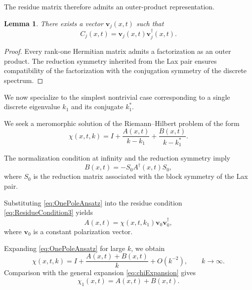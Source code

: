 \documentclass[11pt]{amsart}
\newtheorem{lemma}{Lemma}[section]
\theoremstyle{definition}
\numberwithin{equation}{section}
\begin{document}
The residue matrix therefore admits an outer-product representation.

\begin{lemma}
There exists a vector $\mathbf v_j(x,t)$ such that
\begin{equation}
C_j(x,t)
=
\mathbf v_j(x,t)\mathbf v_j^\dagger(x,t).
\label{eq:RankOneFactorization}
\end{equation}
\end{lemma}

\begin{proof}
Every rank-one Hermitian matrix admits a factorization as an outer product. The reduction symmetry inherited from the Lax pair ensures compatibility of the factorization with the conjugation symmetry of the discrete spectrum.
\end{proof}

We now specialize to the simplest nontrivial case corresponding to a single discrete eigenvalue $k_1$ and its conjugate $k_1^*$.

We seek a meromorphic solution of the Riemann--Hilbert problem of the form
\begin{equation}
\chi(x,t,k)
=
I
+
\frac{A(x,t)}{k-k_1}
+
\frac{B(x,t)}{k-k_1^*}.
\label{eq:OnePoleAnsatz}
\end{equation}

The normalization condition at infinity and the reduction symmetry imply
\begin{equation}
B(x,t)
=
-S_0A^\dagger(x,t)S_0,
\label{eq:Bsymmetry}
\end{equation}
where $S_0$ is the reduction matrix associated with the block symmetry of the Lax pair.

Substituting \eqref{eq:OnePoleAnsatz} into the residue condition \eqref{eq:ResidueCondition3} yields
\begin{equation}
A(x,t)
=
\chi(x,t,k_1)\mathbf v_0\mathbf v_0^\dagger,
\label{eq:Aformula}
\end{equation}
where $\mathbf v_0$ is a constant polarization vector.

Expanding \eqref{eq:OnePoleAnsatz} for large $k$, we obtain
\begin{equation}
\chi(x,t,k)
=
I
+
\frac{A(x,t)+B(x,t)}{k}
+
O(k^{-2}),
\qquad k\to\infty .
\label{eq:LargeKExpansion3}
\end{equation}
Comparison with the general expansion \eqref{eq:chiExpansion} gives
\begin{equation}
\chi_1(x,t)
=
A(x,t)+B(x,t).
\label{eq:Chi1AB}
\end{equation}
\end{document}
